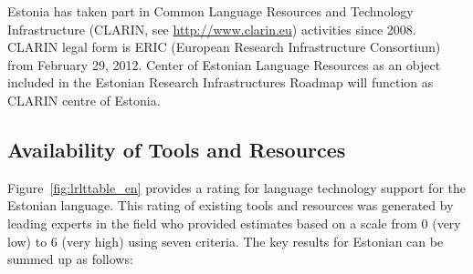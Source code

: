\begin{multicols}{2}
Estonia has taken part in Common Language Resources and Technology Infrastructure (CLARIN, see \url{http://www.clarin.eu}) activities since 2008. CLARIN legal form is ERIC (European Research Infrastructure Consortium) from February 29, 2012. Center of Estonian Language Resources as an object included in the Estonian Research Infrastructures Roadmap will function as CLARIN centre of Estonia.
  
\subsection{Availability of Tools and Resources}

Figure~\ref{fig:lrlttable_en} provides a rating for language technology support for the Estonian language. This rating of existing tools and resources was generated by leading experts in the field who provided estimates based on a scale from 0 (very low) to 6 (very high) using seven criteria. The key results for Estonian can be summed up as follows:


\end{multicols}
